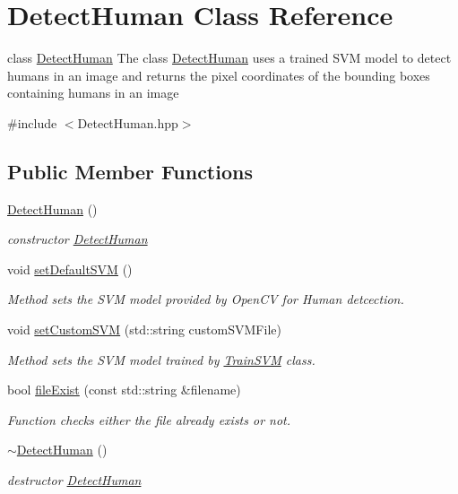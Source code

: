 \hypertarget{classDetectHuman}{}\section{Detect\+Human Class Reference}
\label{classDetectHuman}


class \hyperlink{classDetectHuman}{Detect\+Human} The class \hyperlink{classDetectHuman}{Detect\+Human} uses a trained S\+VM model to detect humans in an image and returns the pixel coordinates of the bounding boxes containing humans in an image  




{\ttfamily \#include $<$Detect\+Human.\+hpp$>$}

\subsection*{Public Member Functions}
\begin{DoxyCompactItemize}
\item 
\hyperlink{classDetectHuman_a20e939b7c8a0c2693032279990685ba3}{Detect\+Human} ()
\begin{DoxyCompactList}\small\item\em constructor \hyperlink{classDetectHuman}{Detect\+Human} \end{DoxyCompactList}\item 
void \hyperlink{classDetectHuman_a7f1ce84b744f283ef4e3c19b5cf27672}{set\+Default\+S\+VM} ()
\begin{DoxyCompactList}\small\item\em Method sets the S\+VM model provided by Open\+CV for Human detcection. \end{DoxyCompactList}\item 
void \hyperlink{classDetectHuman_a29e2cece03d0018624402acdb52db7e2}{set\+Custom\+S\+VM} (std\+::string custom\+S\+V\+M\+File)
\begin{DoxyCompactList}\small\item\em Method sets the S\+VM model trained by \hyperlink{classTrainSVM}{Train\+S\+VM} class. \end{DoxyCompactList}\item 
bool \hyperlink{classDetectHuman_a7e0d6982b991a5dcfeb59916ac682759}{file\+Exist} (const std\+::string \&filename)
\begin{DoxyCompactList}\small\item\em Function checks either the file already exists or not. \end{DoxyCompactList}\item 
\hyperlink{classDetectHuman_a6377cc9bfa2f59bd4b7c0226c0801005}{$\sim$\+Detect\+Human} ()
\begin{DoxyCompactList}\small\item\em destructor \hyperlink{classDetectHuman}{Detect\+Human} \end{DoxyCompactList}\end{DoxyCompactItemize}
